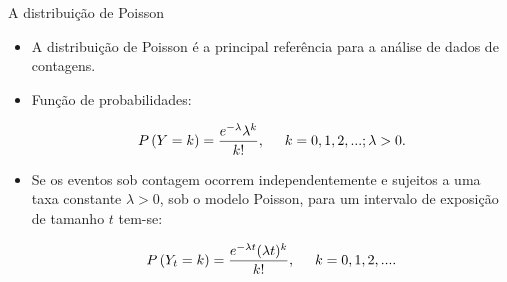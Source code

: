 \documentclass[10pt, aspectratio=169]{beamer}
\begin{document}


\begin{frame}{A distribuição de Poisson}
    
    \begin{itemize}
        \item A distribuição de Poisson é a principal referência para a análise de dados de contagens.
 \vspace{0,3cm}       
        \item Função de probabilidades:

        
$$
    P\left ( Y=k \right )=\frac{e^{-\lambda}\lambda^{k}}{k!},\hspace{5mm}k=0,1,2,...; \lambda>0.
$$
 
   \vspace{0,2cm}    
   
       \item Se os eventos sob contagem  ocorrem independentemente e sujeitos a uma taxa constante $\lambda >0$, sob o modelo Poisson,  para um intervalo de exposição de tamanho $t$ tem-se: 
  
$$
    P\left ( Y_t=k \right )=\frac{e^{-\lambda t}(\lambda t)^{k}}{k!},\hspace{5mm}k=0,1,2,....
$$
        \end{itemize}
        
\end{frame}




\end{document}
